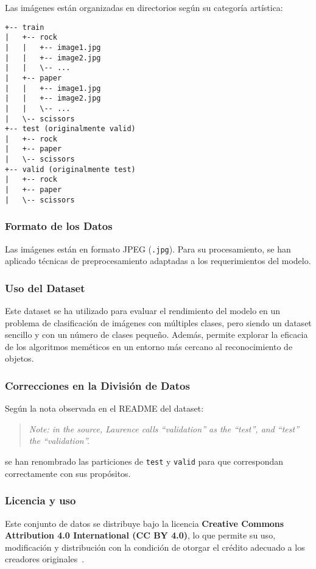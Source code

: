 Las imágenes están organizadas en directorios según su categoría artística:
\begin{verbatim}
+-- train
|   +-- rock
|   |   +-- image1.jpg
|   |   +-- image2.jpg
|   |   \-- ...
|   +-- paper
|   |   +-- image1.jpg
|   |   +-- image2.jpg
|   |   \-- ...
|   \-- scissors
+-- test (originalmente valid)
|   +-- rock
|   +-- paper
|   \-- scissors
+-- valid (originalmente test)
|   +-- rock
|   +-- paper
|   \-- scissors
\end{verbatim}


\subsubsection{Formato de los Datos}
Las imágenes están en formato JPEG (\texttt{.jpg}). Para su procesamiento, se han aplicado técnicas de preprocesamiento
adaptadas a los requerimientos del modelo.

\subsubsection{Uso del Dataset}
Este dataset se ha utilizado para evaluar el rendimiento del modelo en un problema de clasificación de imágenes con
múltiples clases, pero siendo un dataset sencillo y con un número de clases pequeño.
Además, permite explorar la eficacia de los algoritmos meméticos en un entorno más cercano al reconocimiento de objetos.

\subsubsection{Correcciones en la División de Datos}
Según la nota observada en el README del dataset:
\begin{quote}
\textit{Note: in the source, Laurence calls ``validation'' as the ``test'', and ``test'' the ``validation''.}
\end{quote}
se han renombrado las particiones de \texttt{test} y \texttt{valid} para que correspondan correctamente con sus
propósitos.

\subsubsection{Licencia y uso}
 Este conjunto de datos se distribuye bajo la licencia
\textbf{Creative Commons Attribution 4.0 International (CC BY 4.0)}, lo que permite su uso, modificación y distribución
con la condición de otorgar el crédito adecuado a los creadores originales~\cite{moroney_laurence_nodate}.


